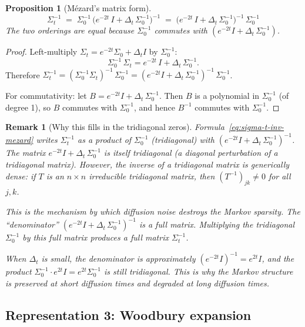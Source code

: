 \documentclass[11pt,a4paper]{article}
\newtheorem{proposition}[theorem]{Proposition}
\newtheorem{remark}[theorem]{Remark}
\newcommand{\Dt}{\Delta_t}
\begin{document}
\begin{proposition}[M\'ezard's matrix form]\label{prop:mezard-form}
\begin{equation}\label{eq:sigma-t-inv-mezard}
  \boxed{\;\Sigma_t^{-1} \;=\; \Sigma_0^{-1}\,\bigl(e^{-2t}\,I + \Dt\,\Sigma_0^{-1}\bigr)^{-1} \;=\; \bigl(e^{-2t}\,I + \Dt\,\Sigma_0^{-1}\bigr)^{-1}\,\Sigma_0^{-1}\;}
\end{equation}
The two orderings are equal because $\Sigma_0^{-1}$ commutes with $(e^{-2t}I + \Dt\,\Sigma_0^{-1})$.
\end{proposition}

\begin{proof}
Left-multiply $\Sigma_t = e^{-2t}\Sigma_0 + \Dt I$ by $\Sigma_0^{-1}$:
\[
  \Sigma_0^{-1}\,\Sigma_t = e^{-2t}\,I + \Dt\,\Sigma_0^{-1}.
\]
Therefore $\Sigma_t^{-1} = (\Sigma_0^{-1}\Sigma_t)^{-1}\,\Sigma_0^{-1} = (e^{-2t}I + \Dt\,\Sigma_0^{-1})^{-1}\,\Sigma_0^{-1}$.

For commutativity: let $B = e^{-2t}I + \Dt\,\Sigma_0^{-1}$.  Then $B$ is a polynomial in $\Sigma_0^{-1}$ (of degree 1), so $B$ commutes with $\Sigma_0^{-1}$, and hence $B^{-1}$ commutes with $\Sigma_0^{-1}$.
\end{proof}

\begin{remark}[Why this fills in the tridiagonal zeros]\label{rem:filling}
Formula~\eqref{eq:sigma-t-inv-mezard} writes $\Sigma_t^{-1}$ as a product of $\Sigma_0^{-1}$ (tridiagonal) with $(e^{-2t}I + \Dt\,\Sigma_0^{-1})^{-1}$.  The matrix $e^{-2t}I + \Dt\,\Sigma_0^{-1}$ is itself tridiagonal (a diagonal perturbation of a tridiagonal matrix).  However, the \emph{inverse of a tridiagonal matrix is generically dense}: if $T$ is an $n \times n$ irreducible tridiagonal matrix, then $(T^{-1})_{jk} \neq 0$ for all $j, k$.

This is the mechanism by which diffusion noise destroys the Markov sparsity.  The ``denominator'' $(e^{-2t}I + \Dt\,\Sigma_0^{-1})^{-1}$ is a full matrix.  Multiplying the tridiagonal $\Sigma_0^{-1}$ by this full matrix produces a full matrix $\Sigma_t^{-1}$.

When $\Dt$ is small, the denominator is approximately $(e^{-2t}I)^{-1} = e^{2t}I$, and the product $\Sigma_0^{-1} \cdot e^{2t}I = e^{2t}\Sigma_0^{-1}$ is still tridiagonal.  This is why the Markov structure is preserved at short diffusion times and degraded at long diffusion times.
\end{remark}

\subsection{Representation 3: Woodbury expansion}
\label{sec:woodbury}
\end{document}
